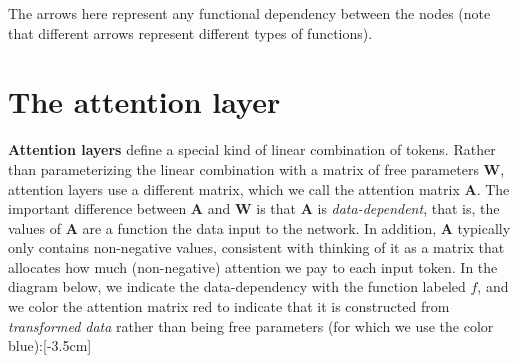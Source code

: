 The arrows here represent any functional dependency between the nodes (note that different arrows represent different types of functions).


\section{The attention layer}
\textbf{Attention layers} define a special kind of linear combination of tokens. Rather than parameterizing the linear combination with a matrix of free parameters $\mathbf{W}$, attention layers use a different matrix, which we call the attention matrix $\mathbf{A}$. The important difference between $\mathbf{A}$ and $\mathbf{W}$ is that $\mathbf{A}$ is \textit{data-dependent}, that is, the values of $\mathbf{A}$ are a function the data input to the network. In addition, $\mathbf{A}$ typically only contains non-negative values, consistent with thinking of it as a matrix that allocates how much (non-negative) attention we pay to each input token. In the diagram below, we indicate the data-dependency with the function labeled $f$, and we color the attention matrix red to indicate that it is constructed from \textit{transformed data} rather than being free parameters (for which we use the color blue):[-3.5cm]
